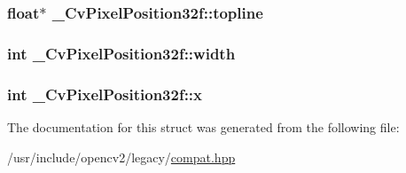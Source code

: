 \hypertarget{struct__CvPixelPosition32f_a5ae43c418cadbad887ee30df18844386}{
\subsubsection[{topline}]{\setlength{\rightskip}{0pt plus 5cm}float$\ast$ \-\_\-\-Cv\-Pixel\-Position32f\-::topline}}\label{struct__CvPixelPosition32f_a5ae43c418cadbad887ee30df18844386}
\hypertarget{struct__CvPixelPosition32f_a2ac704b751dc9dbb51d03ebceddf8967}{
\subsubsection[{width}]{\setlength{\rightskip}{0pt plus 5cm}int \-\_\-\-Cv\-Pixel\-Position32f\-::width}}\label{struct__CvPixelPosition32f_a2ac704b751dc9dbb51d03ebceddf8967}
\hypertarget{struct__CvPixelPosition32f_a9918f352ab511119841330a1518f6919}{
\subsubsection[{x}]{\setlength{\rightskip}{0pt plus 5cm}int \-\_\-\-Cv\-Pixel\-Position32f\-::x}}\label{struct__CvPixelPosition32f_a9918f352ab511119841330a1518f6919}


The documentation for this struct was generated from the following file\-:\begin{DoxyCompactItemize}
\item 
/usr/include/opencv2/legacy/\hyperlink{compat_8hpp}{compat.\-hpp}\end{DoxyCompactItemize}
